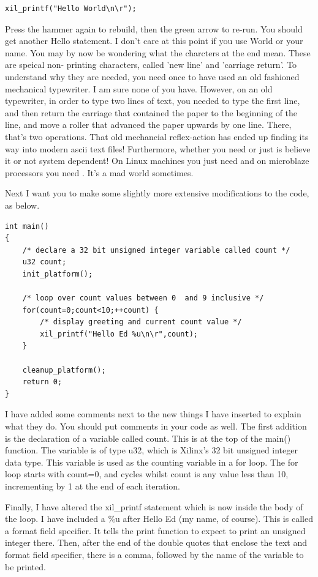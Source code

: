 \documentclass[../physical_computing.tex]{subfiles}
\begin{document}
\begin{verbatim}
xil_printf("Hello World\n\r");
\end{verbatim}

Press the hammer again to rebuild, then the green arrow to re-run.
You should get another Hello statement. I don't care at this point
if you use World or your name. You may by now be wondering what
the \texttt{\crlf} charcters at the end mean. These are speical non-
printing characters, called 'new line' and 'carriage return'. To
understand why they are needed, you need once to have used an old
fashioned mechanical typewriter. I am sure none of you have. However,
on an old typewriter, in order to type two lines of text, you needed
to type the first line, and then return the carriage that contained
the paper to the beginning of the line, and move a roller that advanced
the paper upwards by one line. There, that's two operations. That old
mechancial reflex-action has ended up finding its way into modern
ascii text files! Furthermore, whether you need \texttt{\crlf} or
just \texttt{\linefeed} is believe it or not system dependent! On Linux
machines you just need \texttt{\linefeed} and on microblaze processors you
need \texttt{\crlf}. It's a mad world sometimes.

Next I want you to make some slightly more extensive modifications
to the code, as below. 

\begin{verbatim}
int main()
{
    /* declare a 32 bit unsigned integer variable called count */
    u32 count;
    init_platform();

    /* loop over count values between 0  and 9 inclusive */
    for(count=0;count<10;++count) {
    	/* display greeting and current count value */
    	xil_printf("Hello Ed %u\n\r",count);
    }

    cleanup_platform();
    return 0;
}
\end{verbatim}

I have added some comments next to the new things I have 
inserted to explain what they do. You should put comments in your
code as well. The first addition is the declaration of a variable
called count. This is at the top of the main() function. The
variable is of type u32, which is Xilinx's 32 bit unsigned integer
data type. This variable is used as the counting variable in 
a for loop. The for loop starts with count=0, and cycles whilst
count is any value less than 10, incrementing by 1 at the end of
each iteration. 

Finally, I have altered the xil\_printf statement which is now 
inside the body of the loop. I have included a \%u after Hello
Ed (my name, of course). This is called a format field specifier.
It tells the print function to expect to print an unsigned integer
there. Then, after the end of the double quotes that enclose the 
text and format field specifier, there is a comma, followed by the
name of the variable to be printed.
\end{document}
